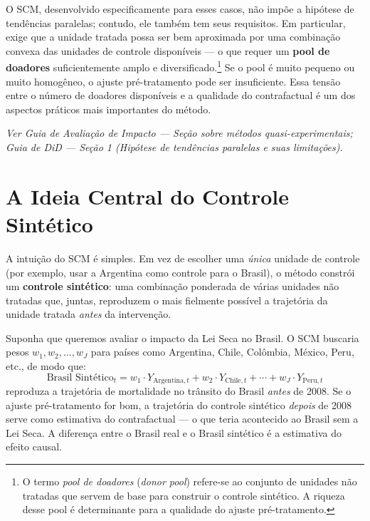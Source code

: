 \documentclass[12pt, a4paper, openany]{book}
\begin{document}
O SCM, desenvolvido especificamente para esses casos, não impõe a hipótese de tendências paralelas; contudo, ele também tem seus requisitos. Em particular, exige que a unidade tratada possa ser bem aproximada por uma combinação convexa das unidades de controle disponíveis --- o que requer um \textbf{pool de doadores} suficientemente amplo e diversificado.\footnote{O termo \textit{pool de doadores} (\textit{donor pool}) refere-se ao conjunto de unidades não tratadas que servem de base para construir o controle sintético. A riqueza desse pool é determinante para a qualidade do ajuste pré-tratamento.} Se o pool é muito pequeno ou muito homogêneo, o ajuste pré-tratamento pode ser insuficiente. Essa tensão entre o número de doadores disponíveis e a qualidade do contrafactual é um dos aspectos práticos mais importantes do método.

\begin{conexaobox}
\textit{Ver Guia de Avaliação de Impacto --- Seção sobre métodos quasi-experimentais; Guia de DiD --- Seção 1 (Hipótese de tendências paralelas e suas limitações).}
\end{conexaobox}


\section{A Ideia Central do Controle Sintético}

A intuição do SCM é simples. Em vez de escolher uma \textit{única} unidade de controle (por exemplo, usar a Argentina como controle para o Brasil), o método constrói um \textbf{controle sintético}: uma combinação ponderada de várias unidades não tratadas que, juntas, reproduzem o mais fielmente possível a trajetória da unidade tratada \textit{antes} da intervenção.

Suponha que queremos avaliar o impacto da Lei Seca no Brasil. O SCM buscaria pesos $w_1, w_2, \ldots, w_J$ para países como Argentina, Chile, Colômbia, México, Peru, etc., de modo que:
\begin{equation}
  \text{Brasil Sintético}_t = w_1 \cdot Y_{\text{Argentina},t} + w_2 \cdot Y_{\text{Chile},t} + \cdots + w_J \cdot Y_{\text{Peru},t}
\end{equation}
reproduza a trajetória de mortalidade no trânsito do Brasil \textit{antes} de 2008. Se o ajuste pré-tratamento for bom, a trajetória do controle sintético \textit{depois} de 2008 serve como estimativa do contrafactual --- o que teria acontecido ao Brasil sem a Lei Seca. A diferença entre o Brasil real e o Brasil sintético é a estimativa do efeito causal.
\end{document}
